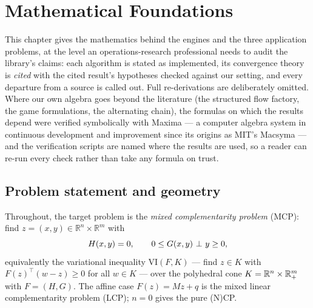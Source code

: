 \chapter{Mathematical Foundations}
\label{ch:math}

This chapter gives the mathematics behind the engines and the three
application problems, at the level an operations-research professional needs
to audit the library's claims: each algorithm is stated as implemented, its
convergence theory is \emph{cited} with the cited result's hypotheses
checked against our setting, and every departure from a source is called
out. Full re-derivations are deliberately omitted. Where our own algebra
goes beyond the literature (the structured flow factory, the game
formulations, the alternating chain), the formulas on which the results
depend were verified symbolically with Maxima \cite{maxima} --- a computer
algebra system in continuous development and improvement since its origins
as MIT's Macsyma \cite{macsyma} --- and the verification scripts are named
where the results are used, so a reader can re-run every check rather than
take any formula on trust.

\section{Problem statement and geometry}
\label{sec:a-problem}

Throughout, the target problem is the \emph{mixed complementarity problem}
(MCP): find $z = (x, y) \in \mathbb{R}^{n} \times \mathbb{R}^{m}$ with
\begin{equation}
  H(x, y) = 0, \qquad 0 \le G(x, y) \ \bot\  y \ge 0,
  \label{eq:mcp}
\end{equation}
equivalently the variational inequality VI$(F, K)$ --- find $z \in K$ with
$F(z)^\top (w - z) \ge 0$ for all $w \in K$ --- over the polyhedral cone
$K = \mathbb{R}^{n} \times \mathbb{R}^{m}_{+}$ with $F = (H, G)$. The affine case $F(z) = Mz + q$ is the mixed linear
complementarity problem (LCP); $n = 0$ gives the pure (N)CP.


